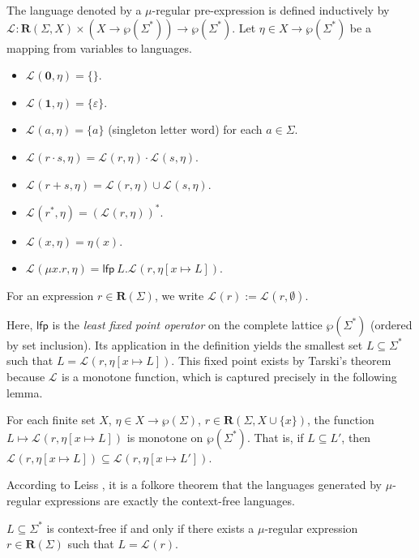 \documentclass[runningheads, envcountsame, a4paper]{llncs}
\newcommand\Power{\wp}
\newcommand\LFP{\textsf{lfp}}
\newcommand\Rnull{\mathbf0}
\newcommand\Rempty{\mathbf1}
\newcommand\Lang[1][{}]{\mathcal{L}^{#1}}
\newcommand\Reg{\mathbf{R}}
\begin{document}
\begin{definition}
  The language denoted by a $\mu$-regular pre-expression is defined
  inductively by $\Lang: \Reg(\Sigma, X) \times (X \to \Power (\Sigma^*))
  \to \Power(\Sigma^*)$. Let $\eta \in X \to \Power (\Sigma^*)$ be a
  mapping from variables to languages.
  \begin{itemize}
  \item $\Lang(\Rnull,  \eta ) = \{\}$.
  \item $\Lang(\Rempty,  \eta ) = \{\varepsilon\}$.
  \item $\Lang(a,  \eta ) = \{a\}$ (singleton letter word) for each
    $a\in\Sigma$.
  \item $\Lang(r\cdot s,  \eta ) = \Lang(r, \eta) \cdot \Lang(s, \eta)$.
  \item $\Lang(r+s,  \eta )  = \Lang(r,  \eta ) \cup \Lang(s,  \eta )$.
  \item $\Lang(r^*,  \eta ) = (\Lang(r,  \eta ))^*$.
  \item $\Lang (x,  \eta ) = \eta (x)$.
  \item $\Lang (\mu x. r,  \eta ) = \LFP\ L. \Lang (r, {\eta[x \mapsto L]}) $.
  \end{itemize}
  For an expression  $r \in \Reg (\Sigma)$,
  we write $\Lang (r) := \Lang (r,  \emptyset)$.
\end{definition}
Here, $\LFP$ is the \emph{least fixed point operator} on the complete
lattice $\Power (\Sigma^*)$ (ordered by set inclusion). Its
application in the definition yields
the smallest set $L \subseteq \Sigma^*$ such that $L = \Lang (r, {\eta[x \mapsto L]})
$. This fixed point exists by Tarski's theorem because $\Lang$ is a monotone
function, which is captured precisely in the following lemma.

\begin{lemma}\label{lemma:lang-is-monotone}
  For each finite set $X$, $\eta \in X \to \Power (\Sigma)$, $r \in \Reg
  (\Sigma, X \cup \{x\})$, the function
  $L \mapsto \Lang (r, { \eta[x \mapsto L]})$ is monotone on
  $\Power (\Sigma^*)$. That is, if $L\subseteq L'$, then $\Lang (r, {\eta[x \mapsto L]})
  \subseteq \Lang (r, { \eta[x \mapsto L']})$.
\end{lemma}

According to Leiss \cite{DBLP:conf/csl/Leiss91}, it is a folkore
theorem that the languages generated by $\mu$-regular expressions are
exactly the context-free languages.

\begin{theorem}
  $L\subseteq \Sigma^*$ is context-free if and only if there exists a
  $\mu$-regular expression $r \in \Reg (\Sigma)$ such that $L = \Lang (r)$.
\end{theorem}
\end{document}
